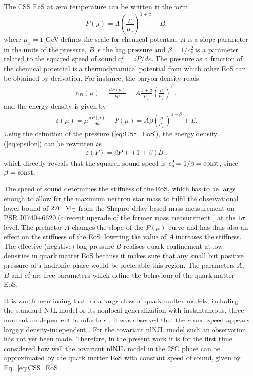 \documentclass[%
 reprint,
superscriptaddress,
nofootinbib,
 amsmath,amssymb,
 aps,
]{revtex4-1}
\begin{document}
The CSS EoS at zero temperature can be written in the form 
\cite{Alford:2013aca,Blaschke:2020vuy}
\begin{equation}
\label{eq:CSS_EoS}
    P(\mu) = A \left( \frac{\mu}{\mu_x}\right)^{1+\beta} - B ,
\end{equation}
where $\mu_x = 1$ GeV defines the scale for chemical potential, $A$ is a slope parameter in the units of the pressure, $B$ is the bag pressure and $\beta = 1/c_s^2$ is a parameter related to the squared speed of sound $c_s^2 = dP/d\varepsilon$.
The pressure as a function of the chemical potential is a thermodynamical potential from which other EoS can be obtained by derivation.
For instance, the baryon density reads
\begin{eqnarray}
n_B(\mu) = \frac{dP(\mu)}{d \mu} = A \frac{1+\beta}{\mu_x} \left(\frac{\mu}{\mu_x} \right)^{\beta}~,
\end{eqnarray}
and the energy density is given by
\begin{eqnarray}
\label{eq:epsilon}
\varepsilon(\mu) = \mu \frac{dP(\mu)}{d \mu} - P(\mu)
= A \beta \left(\frac{\mu}{\mu_x}\right)^{1+\beta} + B.
\end{eqnarray}
Using the definition of the pressure (\ref{eq:CSS_EoS}), the 
energy density (\ref{eq:epsilon}) can be rewritten as 
\begin{eqnarray}
\label{eq:epsilon-p}
\varepsilon(P) =  \beta P + (1+\beta) B~,
\end{eqnarray}
which directly reveals that the squared sound speed is
$c_s^2=1/\beta = {\rm const}$, since $\beta = {\rm const}$. 

The speed of sound determines the stiffness of the EoS, which has to be large enough to allow for the maximum neutron star mass to fulfil the observational lower bound of $2.01~\textmd{M}_\odot$ from the Shapiro-delay based mass measurement on PSR J0740+6620 \cite{fonseca2021refined} (a recent upgrade of the former mass measurement \cite{Cromartie:2019kug}) at the $1\sigma$ level. 
The prefactor $A$ changes the slope of the $P(\mu)$ curve and
has thus also an effect on the stiffness of the EoS: lowering the value of $A$ increases the stiffness.
The effective (negative) bag pressure $B$ realises quark confinement at low densities in quark matter EoS because it makes sure that any small but positive pressure of a hadronic phase would be preferable this region. 
The parameters $A$, $B$ and $c_s^2$ are free parameters which define the behaviour of the quark matter EoS.

It is worth mentioning that for a large class of quark matter models, including the standard NJL model \cite{Agrawal:2010er, Bonanno:2011ch} or its nonlocal generalization with instantaneous, three-momentum dependent formfactors 
\cite{Lastowiecki:2011hh}, it was observed that the sound speed appears largely density-independent \cite{Zdunik:2012dj}. 
For the covariant nlNJL model such an observation has not yet been made.
Therefore, in the present work it is for the first time considered how well the covariant nlNJL model in the 2SC phase can be approximated by the quark matter EoS with constant speed of sound, given by Eq.~\eqref{eq:CSS_EoS}.
\end{document}
